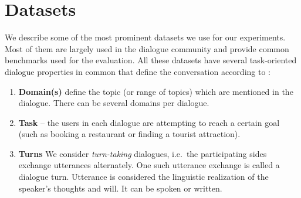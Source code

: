 \section{Datasets}
\label{02:sec:input-data-desc}
We describe some of the most prominent datasets we use for our experiments.
Most of them are largely used in the dialogue community and provide common benchmarks used for the evaluation.
All these datasets have several task-oriented dialogue properties in common that define the conversation according to \cite{young_pomdp-based_2013}:
\begin{enumerate}
\item \textbf{Domain(s)} define the topic (or range of topics) which are mentioned in the dialogue. There can be several domains per dialogue.
\item \textbf{Task} -- the users in each dialogue are attempting to reach a certain goal (such as booking a restaurant or finding a tourist attraction).
\item \textbf{Turns} We consider \emph{turn-taking} dialogues, i.e.\ the participating sides exchange utterances alternately.
One such utterance exchange is called a dialogue turn.
Utterance is considered the linguistic realization of the speaker's thoughts and will. It can be spoken or written. 


\end{enumerate}
